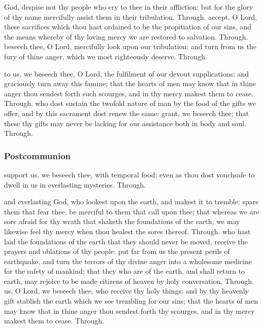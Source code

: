 \begin{multicols}{2}
 God, despise not thy people who cry to thee in their affliction: but for the glory of thy name mercifully assist them in their tribulation. Through.
 accept, O Lord, these sacrifices which thou hast ordained to be the propitiation of our sins, and the means whereby of thy loving mercy we are restored to salvation. Through.
 beseech thee, O Lord, mercifully look upon our tribulation: and turn from us the fury of thine anger, which we most righteously deserve. Through.

 to us, we beseech thee, O Lord, the fulfilment of our devout supplications: and graciously turn away this famine; that the hearts of men may know that in thine anger thou sendest forth such scourges, and in thy mercy makest them to cease. Through.
 who dost sustain the twofold nature of man by the food of the gifts we offer, and by this sacrament dost renew the same: grant, we beseech thee; that these thy gifts may never be lacking for our assistance both in body and soul. Through.
\subsubsection{Postcommunion}
 support us, we beseech thee, with temporal food: even as thou dost vouchsafe to dwell in us in everlasting mysteries. Through.

\vspace{3\baselineskip}

 and everlasting God, who lookest upon the earth, and makest it to tremble: spare them that fear thee, be merciful to them that call upon thee; that whereas we are sore afraid for thy wrath that shaketh the foundations of the earth, we may likewise feel thy mercy when thou healest the sores thereof. Through.
 who hast laid the foundations of the earth that they should never be moved, receive the prayers and oblations of thy people: put far from us the present perils of earthquake, and turn the terrors of thy divine anger into a wholesome medicine for the safety of mankind; that they who are of the earth, and shall return to earth, may rejoice to be made citizens of heaven by holy conversation. Through.
 us, O Lord, we beseech thee, who receive thy holy things: and by thy heavenly gift stablish the earth which we see trembling for our sins; that the hearts of men may know that in thine anger thou sendest forth thy scourges, and in thy mercy makest them to cease. Through.


\end{multicols}
